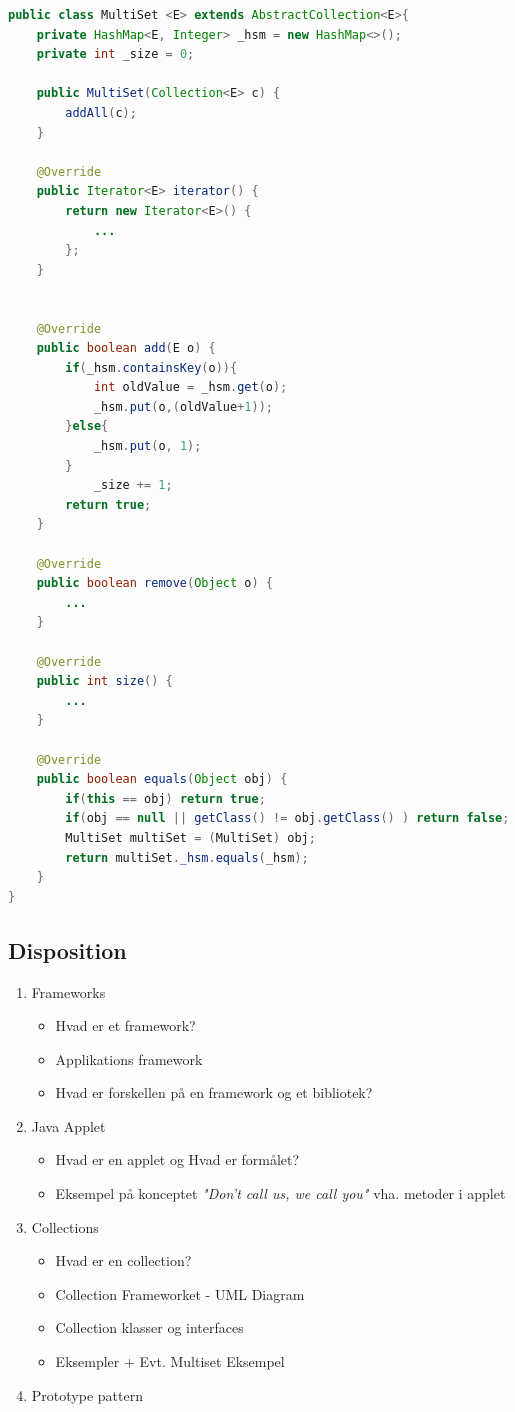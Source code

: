 \documentclass{article}
\begin{document}
\begin{itemize}
\begin{itemize}
\begin{lstlisting}[language=java]
public class MultiSet <E> extends AbstractCollection<E>{
	private HashMap<E, Integer> _hsm = new HashMap<>();
	private int _size = 0;
	
	public MultiSet(Collection<E> c) {
		addAll(c);
	}
	
	@Override
	public Iterator<E> iterator() {
		return new Iterator<E>() {
			...
		};
	}
	
	
	@Override
	public boolean add(E o) {
		if(_hsm.containsKey(o)){
			int oldValue = _hsm.get(o);
			_hsm.put(o,(oldValue+1));
		}else{
			_hsm.put(o, 1);
		}
			_size += 1;
		return true;
	}
	
	@Override
	public boolean remove(Object o) {
		...
	}
	
	@Override
	public int size() {
		...
	}
	
	@Override
	public boolean equals(Object obj) {
		if(this == obj) return true;
		if(obj == null || getClass() != obj.getClass() ) return false;
		MultiSet multiSet = (MultiSet) obj;
		return multiSet._hsm.equals(_hsm);
	}
}
\end{lstlisting}

	\end{itemize}
\end{itemize}

\newpage
\subsection{Disposition}
\begin{enumerate}
	\item Frameworks
	\begin{itemize}
		\item Hvad er et framework?
		\item Applikations framework
		\item Hvad er forskellen på en framework og et bibliotek?		
	\end{itemize}
	\item Java Applet
	\begin{itemize}
		\item Hvad er en applet og Hvad er formålet?
		\item Eksempel på konceptet \textit{"Don't call us, we call you"} vha. metoder i applet 
	\end{itemize}
	\item Collections
	\begin{itemize}
		\item Hvad er en collection?
		\item Collection Frameworket - UML Diagram
		\item Collection klasser og interfaces
		\item Eksempler + Evt. Multiset Eksempel
	\end{itemize}
	\item Prototype pattern 
	
\end{enumerate}
\newpage
\end{document}

